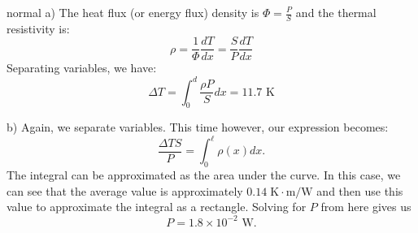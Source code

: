 \begin{solution}{normal}
a) The heat flux (or energy flux) density is $\Phi = \frac{P}{S}$ and the thermal resistivity is:
$$\rho = \frac{1}{\Phi}\frac{dT}{dx} = \frac{S}{P}\frac{dT}{dx}$$
Separating variables, we have:
$$\Delta T = \int_0^d \frac{\rho P}{S} dx =11.7 \text{ K}$$
\vspace{3mm}

\noindent b) Again, we separate variables. This time however, our expression becomes:
$$\frac{\Delta T S}{P} = \int_0^\ell \rho(x) dx.$$
The integral can be approximated as the area under the curve. In this case, we can see that the average value is approximately $0.14\;\mathrm{K\cdot m/W}$ and then use this value to approximate the integral as a rectangle. Solving for $P$ from here gives us 
$$P = 1.8 \times 10^{-2} \text{ W}.$$

\end{solution}